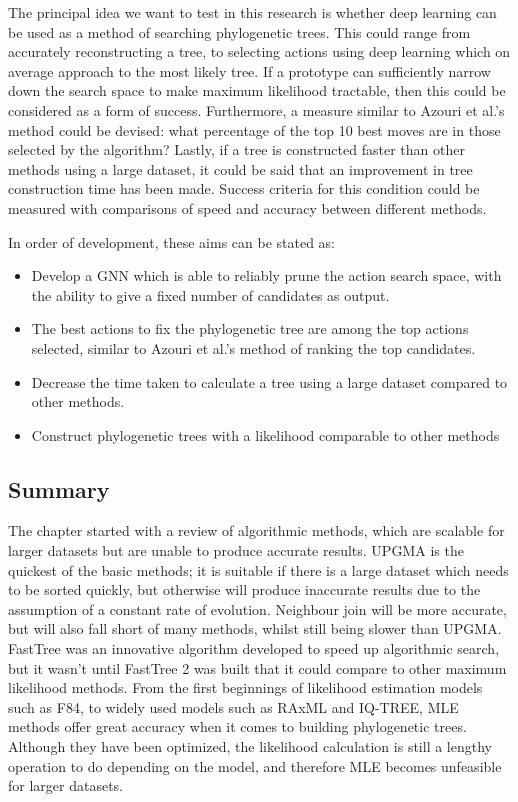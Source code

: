 \documentclass{mpaper}
\begin{document}
The principal idea we want to test in this research is whether deep learning can be used as a method of searching phylogenetic trees. This could range from accurately reconstructing a tree, to selecting actions using deep learning which on average approach to the most likely tree. If a prototype can sufficiently narrow down the search space to make maximum likelihood tractable, then this could be considered as a form of success. Furthermore, a measure similar to Azouri et al.'s \cite{bioMLPaper} method could be devised: what percentage of the top 10 best moves are in those selected by the algorithm? Lastly, if a tree is constructed faster than other methods using a large dataset, it could be said that an improvement in tree construction time has been made. Success criteria for this condition could be measured with comparisons of speed and accuracy between different methods.

In order of development, these aims can be stated as:
\begin{itemize}
  \item Develop a GNN which is able to reliably prune the action search space, with the ability to give a fixed number of candidates as output.
  \item The best actions to fix the phylogenetic tree are among the top actions selected, similar to Azouri et al.'s  \cite{bioMLPaper} method of ranking the top candidates.
  \item Decrease the time taken to calculate a tree using a large dataset compared to other methods.
  \item Construct phylogenetic trees with a likelihood comparable to other methods
\end{itemize}

\subsection{Summary}

The chapter started with a review of algorithmic methods, which are scalable for larger datasets but are unable to produce accurate results. UPGMA is the quickest of the basic methods; it is suitable if there is a large dataset which needs to be sorted quickly, but otherwise will produce inaccurate results due to the assumption of a constant rate of evolution. Neighbour join will be more accurate, but will also fall short of many methods, whilst still being slower than UPGMA. FastTree was an innovative algorithm developed to speed up algorithmic search, but it wasn't until FastTree 2 was built that it could compare to other maximum likelihood methods. From the first beginnings of likelihood estimation models such as F84, to widely used models such as RAxML and IQ-TREE, MLE methods offer great accuracy when it comes to building phylogenetic trees. Although they have been optimized, the likelihood calculation is still a lengthy operation to do depending on the model, and therefore MLE becomes unfeasible for larger datasets. 
\end{document}
